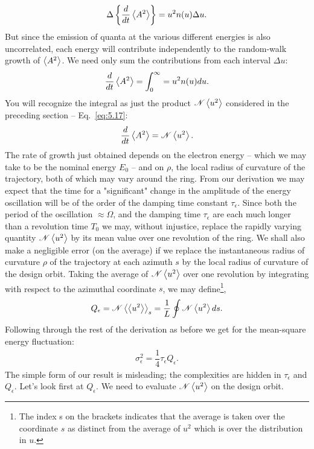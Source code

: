 \begin{align}
	\Delta \left\lbrace \dfrac{d}{dt}\left< A^2 \right> \right\rbrace = u^2 n(u) \Delta u.
\end{align}
But since the emission of quanta at the various different energies is also uncorrelated, each energy will contribute independently to the random-walk growth of $\left< A^2 \right>$. We need only sum the contributions from each interval $\Delta u$:
\begin{align}
	\dfrac{d}{dt}\left< A^2 \right> = \int_0^\infty = u^2 n(u) du.
\end{align}
You will recognize the integral as just the product $\mathscr{N}\left< u^2 \right>$ considered in the preceding section -- Eq.~\eqref{eq:5.17}:
\begin{align}
	\dfrac{d}{dt} \left< A^2 \right> = \mathscr{N} \left< u^2 \right>.
\end{align}
The rate of growth just obtained depends on the electron energy -- which we may take to be the nominal energy $E_0$ -- and on $\rho$, the local radius of curvature of the trajectory, both of which may vary around the ring. From our derivation we may expect that the time for a "significant" change in the amplitude of the energy oscillation will be of the order of the damping time constant $\tau_\epsilon$. Since both the period of the oscillation $\approx \Omega$,
 and the damping time $\tau_\epsilon$ are each much longer than a revolution time $T_0$ we may, without injustice, replace the rapidly varying quantity $\mathscr{N}\left< u^2 \right>$ by its mean value over one revolution of the ring. We shall also make a negligible error (on the average) if we replace the instantaneous radius of curvature $\rho$ of the trajectory at each azimuth $s$ by the local radius of curvature of the design orbit. Taking the average of $\mathscr{N}\left< u^2 \right>$
 over one revolution by integrating with respect to the azimuthal coordinate $s$, we may define\footnote{The index s on the brackets indicates that the average is taken over the coordinate $s$ as distinct from the average of $u^2$ which is over the distribution in $u$.},
\begin{align}
	Q_\epsilon = \mathscr{N}\left< \left< u^2 \right> \right>_s = \dfrac{1}{L} \oint \mathscr{N} \left< u^2 \right> ds.
\end{align}
Following through the rest of the derivation as before we get for the mean-square energy fluctuation:
\begin{align} \label{eq:5.37}
	\sigma_\epsilon^2 = \dfrac{1}{4} \tau_\epsilon Q_\epsilon.
\end{align}
The simple form of our result is misleading; the complexities are hidden in $\tau_\epsilon$ and $Q_\epsilon$. Let's look first at $Q_\epsilon$. We need to evaluate $\mathscr{N} \left< u^2 \right>$ on the design orbit.\\
